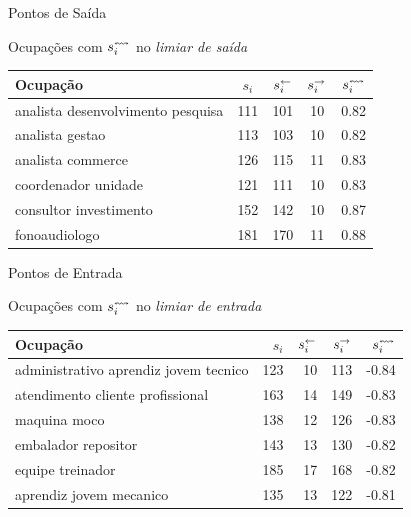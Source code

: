 \documentclass[10pt, hyperref={pdfpagelabels=false}]{beamer}
\begin{document}
\begin{frame}[label=hipotese-ponto-de-saida-tabela]{Pontos de Saída}
  \begin{center}
    Ocupações com $s_i^\leftrightsquigarrow$ no \textit{limiar de saída}
    
    \vspace{\baselineskip}
    
    \begin{tabular}{l|c|c|c|c}
      \hline
      Ocupação & $s_i$ & $s_i^\leftarrow$ & $s_i^\rightarrow$ & $s_i^\leftrightsquigarrow$\\
      \hline
      analista desenvolvimento pesquisa & 111 & 101 & 10 & 0.82\\
      \hline
      analista gestao & 113 & 103 & 10 & 0.82\\
      \hline
      analista commerce & 126 & 115 & 11 & 0.83\\
      \hline
      coordenador unidade & 121 & 111 & 10 & 0.83\\
      \hline
      consultor investimento & 152 & 142 & 10 & 0.87\\
      \hline
      fonoaudiologo & 181 & 170 & 11 & 0.88\\
      \hline
    \end{tabular}
  \end{center}
\end{frame}


\begin{frame}[label=hipotese-ponto-de-entrada-tabela]{Pontos de Entrada}
  \begin{center}
    Ocupações com $s_i^\leftrightsquigarrow$ no \textit{limiar de entrada}
    
    \vspace{\baselineskip}
    
    \begin{tabular}{l|r|r|r|r}
      \hline
      Ocupação & $s_i$ & $s_i^\leftarrow$ & $s_i^\rightarrow$ & $s_i^\leftrightsquigarrow$\\
      \hline
      administrativo aprendiz jovem tecnico & 123 & 10 & 113 & -0.84\\
      \hline
      atendimento cliente profissional & 163 & 14 & 149 & -0.83\\
      \hline
      maquina moco & 138 & 12 & 126 & -0.83\\
      \hline
      embalador repositor & 143 & 13 & 130 & -0.82\\
      \hline
      equipe treinador & 185 & 17 & 168 & -0.82\\
      \hline
      aprendiz jovem mecanico & 135 & 13 & 122 & -0.81\\
      \hline
    \end{tabular}
  \end{center}
\end{frame}
\end{document}
